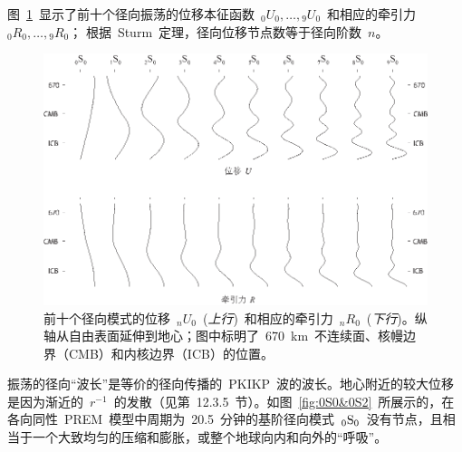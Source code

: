 {\enlargethispage{-0.5mm}
图~\ref{fig:radeifs}~显示了前十个径向振荡的位移本征函数~${}_0U_0,\ldots,{}_9U_0$~和相应的牵引力~${}_0R_0,\ldots,{}_9R_0$；
%
%
根据~Sturm~定理，径向位移节点数等于径向阶数~$n$。
\begin{figure}
\begin{center}
\includegraphics{../figures/chap08/fig16.eps}
\end{center}
\caption[radeifs]{\label{fig:radeifs}
前十个径向模式的位移~${}_nU_0$~({\em 上行\/})~和相应的牵引力~${}_nR_0$~({\em 下行\/})。纵轴从自由表面延伸到地心；图中标明了~670~km~不连续面、核幔边界（CMB）和内核边界（ICB）的位置。
}
\end{figure}
振荡的径向“波长”是等价的径向传播的~PKIKP~波的波长。地心附近的较大位移是因为渐近的~$r^{-1}$~的发散（见第~12.3.5~节）。如图~\ref{fig:0S0&0S2}~所展示的，在各向同性~PREM~模型中周期为~20.5~分钟的基阶径向模式~${}_0{\rm S}_0$~没有节点，且相当于一个大致均匀的压缩和膨胀，或整个地球向内和向外的“呼吸”。
\begin{figure}[!t]
\begin{center}
\end{center}
\end{figure}}
